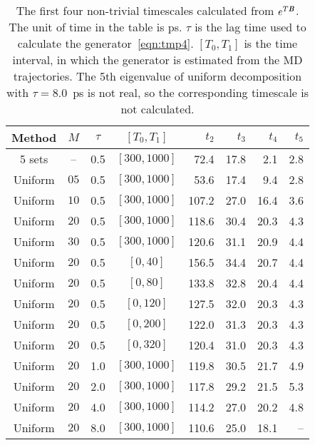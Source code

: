 \documentclass[aps, pre, preprint,unsortedaddress,a4paper,onecolumn]{revtex4-1}
\newcommand{\vect}[1]{\textbf{\textit{#1}}}
\begin{document}
\begin{table}
  \centering
  \caption{The first four non-trivial timescales calculated from $e^{T\vect B}$. The unit of time in the table is ps.
    $\tau$ is the lag time used to calculate the generator~\eqref{eqn:tmp4}. $[T_0,T_1]$ is the time interval,
    in which the generator is estimated from the MD trajectories. The 5th eigenvalue of uniform decomposition with $\tau=8.0$~ps is not real, so
    the corresponding timescale is not calculated.
  }
  \begin{tabular*}{0.9\textwidth}{@{\extracolsep{\fill}}c ccc rrrr}\hline\hline
    Method  &  $M$ & $\tau$ & $[T_0,T_1]$ &   $t_2$ &   $t_3$ &   $t_4$ &   $t_5$  \\\hline
    5 sets  & --   & 0.5    & $[300,1000]$    &  72.4 & 17.8 &  2.1 & 2.8    \\
    Uniform & $05$ & 0.5    & $[300,1000]$    &  53.6 & 17.4 &  9.4 & 2.8    \\
    Uniform & $10$ & 0.5    & $[300,1000]$    & 107.2 & 27.0 & 16.4 & 3.6    \\
    Uniform & $20$ & 0.5    & $[300,1000]$    & 118.6 & 30.4 & 20.3 & 4.3    \\
    Uniform & $30$ & 0.5    & $[300,1000]$    & 120.6 & 31.1 & 20.9 & 4.4    \\\hline
    Uniform & $20$ & 0.5    & $[0,40]$    & 156.5 & 34.4 & 20.7 & 4.4    \\
    Uniform & $20$ & 0.5    & $[0,80]$    & 133.8 & 32.8 & 20.4 & 4.4    \\
    Uniform & $20$ & 0.5    & $[0,120]$   & 127.5 & 32.0 & 20.3 & 4.3    \\
    Uniform & $20$ & 0.5    & $[0,200]$   & 122.0 & 31.3 & 20.3 & 4.3    \\
    Uniform & $20$ & 0.5    & $[0,320]$   & 120.4 & 31.0 & 20.3 & 4.3    \\\hline
    Uniform & $20$ & 1.0    & $[300,1000]$    & 119.8 & 30.5 & 21.7 & 4.9   \\
    Uniform & $20$ & 2.0    & $[300,1000]$    & 117.8 & 29.2 & 21.5 & 5.3   \\
    Uniform & $20$ & 4.0    & $[300,1000]$    & 114.2 & 27.0 & 20.2 & 4.8   \\
    Uniform & $20$ & 8.0    & $[300,1000]$    & 110.6 & 25.0 & 18.1 & --   \\
    \hline\hline
  \end{tabular*}
  \label{tab:tmp1}
\end{table}
\end{document}
